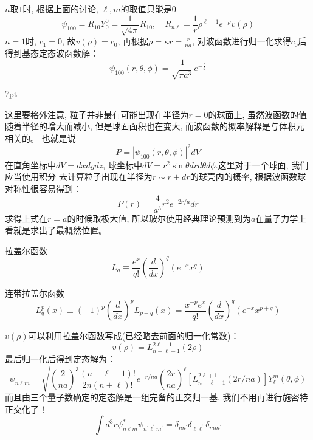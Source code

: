 \documentclass[a4paper,zihao=-4,linespread=1]{ctexrep}
\newenvironment{lequation}{\large\begin{equation}}{\end{equation}}
\newenvironment{thinknote}{%
\def\FrameCommand{%
\hspace{1pt}%
{\color{BurlyWood}\vrule width 2pt}%
{\color{formalshade}\vrule width 4pt}%
\colorbox{formalshade}%
}%
\MakeFramed{\advance\hsize-\width\FrameRestore}%
\noindent\hspace{-4.55pt}%
\begin{adjustwidth}{}{7pt}%
\vspace{2pt}\vspace{2pt}%
}
{%
\vspace{2pt}\end{adjustwidth}\endMakeFramed%
}
\begin{document}
    $n$取$1$时, 根据上面的讨论, $\ell,m$的取值只能是$0$
    \[\psi_{100}=R_{10}Y_0^0=\frac{1}{\sqrt{4\pi}}R_{10},\quad R_{n\ell}=\frac{1}{r}\rho^{\ell+1}e^{-\rho}v(\rho)\]
    $n=1$时, $c_1=0$, 故$v(\rho)=c_0$, 再根据$\rho=\kappa r=\frac{r}{n a}$, 对波函数进行归一化求得$c_0$后得到基态定态波函数解：
    \begin{lequation}
        \boxed{\psi_{100}(r,\theta,\phi)=\frac{1}{\sqrt{\pi a^3}}e^{-\frac{r}{a}}}
    \end{lequation}
    \begin{thinknote}
        这里要格外注意, 粒子并非最有可能出现在半径为$r=0$的球面上, 虽然波函数的值随着半径的增大而减小, 但是球面面积也在变大, 而波函数的概率解释是与体积元相关的。
        也就是说\[P=\left|\psi_{100}(r,\theta,\phi)\right|^2dV\]在直角坐标中$dV=dxdydz$, 球坐标中$dV=r^2\sin\theta drd\theta d\phi$.这里对于一个球面, 我们应当使用积分
        去计算粒子出现在半径为$r\sim r+dr$的球壳内的概率, 根据波函数球对称性很容易得到：\[P(r)=\frac{4}{a^3}r^2e^{-2r/a}dr\]
        求得上式在$r=a$的时候取极大值, 所以玻尔使用经典理论预测到为$a$在量子力学上看就是求出了最概然位置。
    \end{thinknote}
    \begin{define}{拉盖尔函数}
        \begin{equation}
            L_q\equiv\frac{e^x}{q!}\left(\frac{d}{dx}\right)^q\left(e^{-x}x^q\right)    
        \end{equation}
    \end{define}
    \begin{define}{连带拉盖尔函数}
        \begin{equation}
            L_q^p(x)\equiv(-1)^p\left(\frac{d}{dx}\right)^pL_{p+q}(x)=\frac{x^{-p}e^x}{q!}\left(\frac{d}{dx}\right)^q\left(e^{-x}x^{p+q}\right)
        \end{equation}
    \end{define}
    $v(\rho)$可以利用拉盖尔函数写成(已经略去前面的归一化常数)：
    \begin{equation}
        v(\rho)=L_{n-\ell-1}^{2\ell+1}(2\rho)
    \end{equation}
    最后归一化后得到定态解为：
    \begin{equation}
        \boxed{
            \psi_{n \ell m}=\sqrt{\left(\frac{2}{n a}\right)^{3} \frac{(n-\ell-1) !}{2 n(n+\ell) !}} e^{-r / n a}\left(\frac{2 r}{n a}\right)^{\ell}\left[L_{n-\ell-1}^{2 \ell+1}(2 r / n a)\right] Y_{\ell}^{m}(\theta, \phi)
        }
    \end{equation}
    而且由三个量子数确定的定态解是一组完备的正交归一基, 我们不用再进行施密特正交化了！
    \begin{equation}
        \int d^3r \psi_{n\ell m}^*\psi_{n^\prime\ell^\prime m^\prime}=\delta_{nn^\prime}\delta_{\ell \ell^\prime}\delta_{mm^\prime}
    \end{equation}
    
\end{document}
